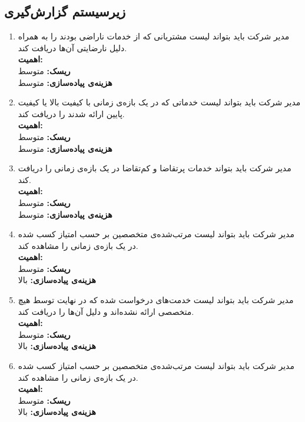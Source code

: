 \subsection{زیرسیستم گزارش‌گیری}

\begin{enumerate}

\item
مدیر شرکت باید بتواند لیست مشتریانی که از خدمات ناراضی بودند را به همراه دلیل نارضایتی آن‌ها دریافت کند.
\\
\textbf{اهمیت:} 
\\
\textbf{ریسک:} متوسط
\\
\textbf{هزینه‌ی پیاده‌سازی:} متوسط

\item
مدیر شرکت باید بتواند لیست خدماتی که در یک بازه‌ی زمانی با کیفیت بالا یا کیفیت پایین ارائه شدند را دریافت کند.
\\
\textbf{اهمیت:} 
\\
\textbf{ریسک:} متوسط
\\
\textbf{هزینه‌ی پیاده‌سازی:} متوسط

\item
مدیر شرکت باید بتواند خدمات پرتقاضا و کم‌تقاضا در یک بازه‌ی زمانی را دریافت کند.
\\
\textbf{اهمیت:} 
\\
\textbf{ریسک:} متوسط
\\
\textbf{هزینه‌ی پیاده‌سازی:} متوسط

\item
مدیر شرکت باید بتواند لیست مرتب‌شده‌ی متخصصین بر حسب امتیاز کسب شده در یک بازه‌ی زمانی را مشاهده کند.
\\
\textbf{اهمیت:} 
\\
\textbf{ریسک:} متوسط
\\
\textbf{هزینه‌ی پیاده‌سازی:} بالا

\item
مدیر شرکت باید بتواند لیست خدمت‌های درخواست شده که در نهایت توسط هیچ متخصصی ارائه نشده‌اند و دلیل آن‌ها را دریافت کند.
\\
\textbf{اهمیت:} 
\\
\textbf{ریسک:} متوسط
\\
\textbf{هزینه‌ی پیاده‌سازی:} بالا

\item
مدیر شرکت باید بتواند لیست مرتب‌شده‌ی متخصصین بر حسب امتیاز کسب شده در یک بازه‌ی زمانی را مشاهده کند.
\\
\textbf{اهمیت:} 
\\
\textbf{ریسک:} متوسط
\\
\textbf{هزینه‌ی پیاده‌سازی:} بالا


\end{enumerate}
